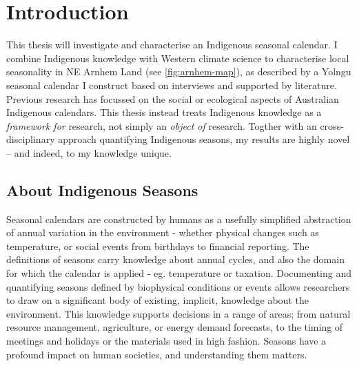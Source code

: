 \chapter{Introduction}

This thesis will investigate and characterise an Indigenous seasonal calendar.
I combine Indigenous knowledge with Western climate science to characterise
local seasonality in NE Arnhem Land (see \autoref{fig:arnhem-map}),
as described by a Yolngu seasonal calendar I construct based on
interviews and supported by literature.\\

Previous research has focussed on the social or ecological aspects of Australian
Indigenous calendars.  This thesis instead treats Indigenous knowledge as a
\emph{framework for} research, not simply an \emph{object of} research.
Togther with an cross-disciplinary approach quantifying Indigenous seasons,
my results are highly novel -- and indeed, to my knowledge unique.



\section{About Indigenous Seasons}

Seasonal calendars are constructed by humans as a usefully simplified
abstraction of annual variation in the environment - whether physical
changes such as temperature, or social events from birthdays to financial
reporting.  The definitions of seasons carry knowledge about annual cycles,
and also the domain for which the calendar is applied - eg. temperature
or taxation.
%
Documenting and quantifying seasons defined by biophysical conditions
or events allows researchers to draw on a significant body of existing,
implicit, knowledge about the environment.
%
This knowledge supports decisions in a range of areas; from natural
resource management, agriculture, or energy demand forecasts, to
the timing of meetings and holidays or the materials used in high fashion.
Seasons have a profound impact on human societies, and understanding
them matters.\\



